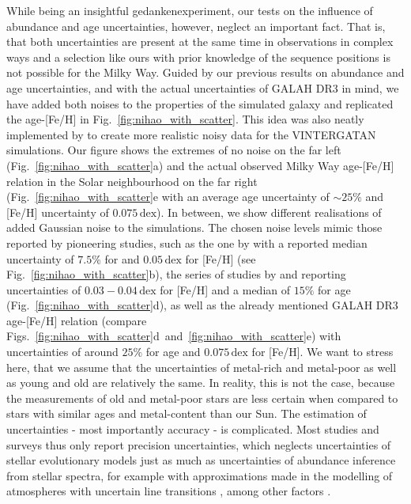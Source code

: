 \documentclass[fleqn,usenatbib]{mnras}
\begin{document}
While being an insightful gedankenexperiment, our tests on the influence of abundance and age uncertainties, however, neglect an important fact. That is, that both uncertainties are present at the same time in observations in complex ways and a selection like ours with prior knowledge of the sequence positions is not possible for the Milky Way. Guided by our previous results on abundance and age uncertainties, and with the actual uncertainties of GALAH DR3 in mind, we have added both noises to the properties of the simulated galaxy and replicated the age-[Fe/H] in Fig.~\ref{fig:nihao_with_scatter}. This idea was also neatly implemented by \citet[][see their Fig.~12]{Renaud2021} to create more realistic noisy data for the \textsc{VINTERGATAN} simulations. Our figure shows the extremes of no noise on the far left (Fig.~\ref{fig:nihao_with_scatter}a) and the actual observed Milky Way age-[Fe/H] relation in the Solar neighbourhood on the far right (Fig.~\ref{fig:nihao_with_scatter}e with an average age uncertainty of $\sim 25\%$ and [Fe/H] uncertainty of $0.075\,\mathrm{dex}$). In between, we show different realisations of added Gaussian noise to the simulations. The chosen noise levels mimic those reported by pioneering studies, such as the one by \citet{Xiang2022} with a reported median uncertainty of $7.5\%$ for and $0.05\,\mathrm{dex}$ for [Fe/H] (see Fig.~\ref{fig:nihao_with_scatter}b), the series of studies by \citet{Nissen2010} and \citet{Schuster2012} reporting uncertainties of $0.03-0.04\,\mathrm{dex}$ for [Fe/H] and a median of $15\%$ for age (Fig.~\ref{fig:nihao_with_scatter}d), as well as the already mentioned GALAH DR3 age-[Fe/H] relation (compare Figs.~\ref{fig:nihao_with_scatter}d~and~\ref{fig:nihao_with_scatter}e) with uncertainties of around $25\%$ for age and $0.075\,\mathrm{dex}$ for [Fe/H]. We want to stress here, that we assume that the uncertainties of metal-rich and metal-poor as well as young and old are relatively the same. In reality, this is not the case, because the measurements of old and metal-poor stars are less certain \citep{Frebel2015} when compared to stars with similar ages and metal-content than our Sun. The estimation of uncertainties - most importantly accuracy - is complicated. Most studies and surveys thus only report precision uncertainties, which neglects uncertainties of stellar evolutionary models \citep{Soderblom2010} just as much as uncertainties of abundance inference from stellar spectra, for example with approximations made in the modelling of atmospheres with uncertain line transitions \citep{Mihalas1973, Asplund2005}, among other factors \citep{Jofre2017, Jofre2018, Nissen2018}.
\end{document}
